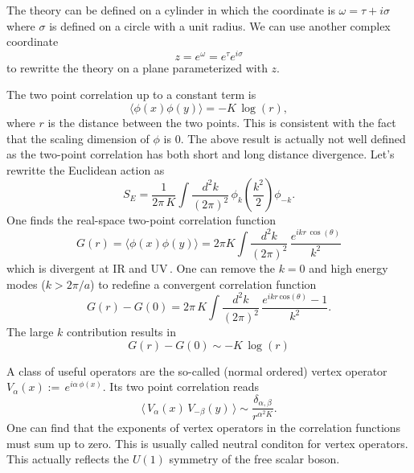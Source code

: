 \documentclass[submission, PhysLectNotes]{SciPost}
\begin{document}
The theory can be defined on a cylinder in which the coordinate is $\omega = \tau + i\sigma$ where $\sigma$ is defined on a circle with a unit radius. We can use another complex coordinate
\begin{equation}
  z = e^\omega = e^\tau e^{i\sigma}
\end{equation}
to rewritte the theory on a plane parameterized with $z$.

The two point correlation up to a constant term is
\begin{equation}
    \langle \phi(x) \phi(y) \rangle = -K\,\mathrm{\log} (r),
\end{equation}
where $r$ is the distance between the two points. This is consistent with the fact that the scaling dimension of $\phi$ is 0. The above result is actually not well defined as the two-point correlation has both short and long distance divergence. Let's rewritte the Euclidean action as 
\begin{equation}
	S_E = \frac{1}{2\pi\,K} \int\frac{d^2k}{(2\pi)^2} \, \phi_k \left(\frac{k^2}{2}\right)\phi_{-k}.
\end{equation} 
One finds the real-space two-point correlation function
\begin{equation}
	G(r) = \langle \phi(x) \phi(y) \rangle = 2\pi K \int \frac{d^2k}{(2\pi)^2}\, \frac{e^{ikr\,\cos(\theta)}}{k^2}
\end{equation}
which is divergent at IR and UV\,. One can remove the $k=0$ and high energy modes ($k>2\pi/a$) to redefine a convergent correlation function 
\begin{equation}
	G(r) - G(0) = 2\pi\,K \int \frac{d^2k}{(2\pi)^2}\, \frac{e^{ikr\,\mathrm{cos}(\theta)}-1}{k^2}.
\end{equation}
The large $k$ contribution results in
\begin{equation}
	G(r) - G(0) \sim -K\,\log(r)
\end{equation}

A class of useful operators are the so-called (normal ordered) vertex operator $V_{\alpha}(x) :=\, e^{i\alpha\,\phi(x)}$. Its two point correlation reads
\begin{equation}
	\langle\, V_\alpha(x)\, V_{-\beta}(y)\, \rangle \sim \frac{\delta_{\alpha,\beta}}{r^{\alpha^2 K}}.
\end{equation}
One can find that the exponents of vertex operators in the correlation functions must sum up to zero. This is usually called neutral conditon for vertex operators. This actually reflects the $U(1)$ symmetry of the free scalar boson. 
\end{document}
